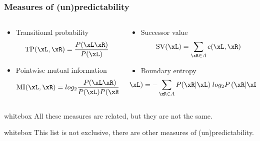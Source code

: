 \begin{frame}
\frametitle{Measures of (un)predictability}
\begin{columns}[t]
\begin{column}{0.5\textwidth}
\begin{itemize}
\item Transitional probability
  \begin{equation*}
    \text{TP}(\xL,\xR) 
                   = \frac{P(\xL\xR)}{P(\xL)} 
  \end{equation*}
\item Pointwise mutual information
\begin{equation*}
    \textrm{MI}(\xL,\xR) = log_2 \frac{P(\xL\xR)}{P(\xL) P(\xR)}
\end{equation*}
\end{itemize}
\end{column}
\begin{column}{0.5\textwidth}
\begin{itemize}
\item Successor value
\begin{equation*}
\textrm{SV}(\xL) = \sum_{\xR\in A} c(\xL,\xR)
\end{equation*}
\item Boundary entropy
\begin{equation*}\hspace{-10mm}
    \textrm{H}(\xL) = -\sum_{\xR\in A}
          P(\xR|\xL) \; log_2 P\left(\xR|\xL\right)
  \end{equation*}
\end{itemize}
\end{column}
\end{columns}

\vspace{2mm}\begin{beamercolorbox}[sep=0.2em,rounded=true]{whitebox}
\centering All these measures are related, but they are not the same.
\end{beamercolorbox}
\vspace{2mm}\begin{beamercolorbox}[sep=0.2em,rounded=true]{whitebox}
\centering This list is not exclusive, there are other measures of
(un)predictability.
\end{beamercolorbox}

\end{frame}
